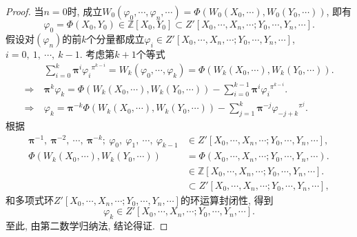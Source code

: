 \documentclass[UTF8, twoside]{ctexart}
\theoremstyle{nonumberplain}
\newtheorem{proof}{\heiti 证明}  %
\theoremstyle{nonumberplain}
\theoremstyle{plain}
\begin{document}
	\begin{proof}
		当$n=0$时, 成立${{W}_{0}}\left( {{\varphi }_{0}},\cdots ,{{\varphi }_{n}},\cdots  \right)=\Phi \left( {{W}_{0}}\left( {{X}_{0}},\cdots  \right),{{W}_{0}}\left( {{Y}_{0}},\cdots  \right) \right)$, 即有
		\[
			{{\varphi }_{0}}=\Phi \left( {{X}_{0}},{{Y}_{0}} \right)\in \mathbb{Z}\left[ {{X}_{0}},{{Y}_{0}} \right]\subset Z'\left[ {{X}_{0}},\cdots ,{{X}_{n}},\cdots ;{{Y}_{0}},\cdots ,{{Y}_{n}},\cdots  \right].
		\]
		假设对$\left( {{\varphi }_{n}} \right)$的前$k$个分量都成立${{\varphi }_{i}}\in Z'\left[ {{X}_{0}},\cdots ,{{X}_{n}},\cdots ;{{Y}_{0}},\cdots ,{{Y}_{n}},\cdots  \right]$, $i=0,\ 1,\ \cdots ,\ k-1$.  考虑第$k+1$个等式
		\begin{align*}
			& \sum\limits_{i=0}^{k}{{\bm{\pi }^{i}}{{\varphi }_{i}}^{{{\pi }^{k-i}}}}={{W}_{k}}\left( {{\varphi }_{0}},\cdots ,{{\varphi }_{k}} \right)=\Phi \left( {{W}_{k}}\left( {{X}_{0}},\cdots  \right),{{W}_{k}}\left( {{Y}_{0}},\cdots  \right) \right). \\ 
			\Longrightarrow\ & {\bm{\pi }^{k}}{{\varphi }_{k}}=\Phi \left( {{W}_{k}}\left( {{X}_{0}},\cdots  \right),{{W}_{k}}\left( {{Y}_{0}},\cdots  \right) \right)-\sum\limits_{i=0}^{k-1}{{\bm{\pi }^{i}}{{\varphi }_{i}}^{{{\pi }^{k-i}}}}. \\ 
			\Longrightarrow\ & {{\varphi }_{k}}={\bm{\pi }^{-k}}\Phi \left( {{W}_{k}}\left( {{X}_{0}},\cdots  \right),{{W}_{k}}\left( {{Y}_{0}},\cdots  \right) \right)-\sum\limits_{j=1}^{k}{{\bm{\pi }^{-j}}{{\varphi }_{-j+k}}^{{{\pi }^{j}}}}.
		\end{align*}
		根据
		\begin{align*}
			{\bm{\pi }^{-1}},\ {\bm{\pi }^{-2}},\ \cdots ,\ {\bm{\pi }^{-k}};\ {{\varphi }_{0}},\ {{\varphi }_{1}},\ \cdots ,\ {{\varphi }_{k-1}}&\in Z'\left[ {{X}_{0}},\cdots ,{{X}_{n}},\cdots ;{{Y}_{0}},\cdots ,{{Y}_{n}},\cdots  \right], \\ 
			\Phi \left( {{W}_{k}}\left( {{X}_{0}},\cdots  \right),{{W}_{k}}\left( {{Y}_{0}},\cdots  \right) \right)&=\Phi \left( {{X}_{0}},\cdots ,{{X}_{n}},\cdots ;{{Y}_{0}},\cdots ,{{Y}_{n}},\cdots  \right). \\ 
			&\in \mathbb{Z}\left[ {{X}_{0}},\cdots ,{{X}_{n}},\cdots ;{{Y}_{0}},\cdots ,{{Y}_{n}},\cdots  \right]. \\ 
			& \subset Z'\left[ {{X}_{0}},\cdots ,{{X}_{n}},\cdots ;{{Y}_{0}},\cdots ,{{Y}_{n}},\cdots  \right],
		\end{align*}
		和多项式环$Z'\left[ {{X}_{0}},\cdots ,{{X}_{n}},\cdots ;{{Y}_{0}},\cdots ,{{Y}_{n}},\cdots  \right]$的环运算封闭性, 得到
		\[
			{{\varphi }_{k}}\in Z'\left[ {{X}_{0}},\cdots ,{{X}_{n}},\cdots ;{{Y}_{0}},\cdots ,{{Y}_{n}},\cdots  \right].
		\]
		至此, 由第二数学归纳法, 结论得证. 
	\end{proof}
\end{document}
